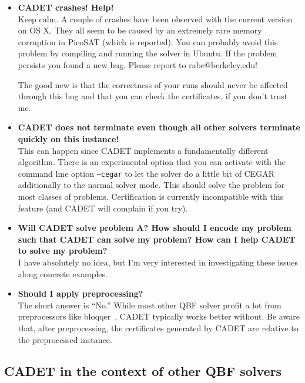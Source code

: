 \documentclass{article}
\begin{document}
\begin{itemize}
	\item {\bf CADET crashes! Help!}  \\[8pt]
		Keep calm. A couple of crashes have been observed with the current version on OS X. They all seem to be  caused by an extremely rare memory corruption in PicoSAT (which is reported). 
		You can probably avoid this problem by compiling and running the solver in Ubuntu. 
		If the problem persists you found a new bug. Please report to rabe@berkeley.edu!
		
		The good new is that the correctness of your runs should never be affected through this bug and that you can check the certificates, if you don't trust me. 
	\item {\bf CADET does not terminate even though all other solvers terminate quickly on this instance!} \\[8pt]
		This can happen since CADET implements a fundamentally different algorithm. 
		There is an experimental option that you can activate with the command line option \texttt{--cegar} to let the solver do a little bit of CEGAR additionally to the normal solver mode. 
		This should solve the problem for most classes of problems. 
		Certification is currently incompatible with this feature (and CADET will complain if you try).
		
	\item {\bf Will CADET solve problem A? How should I encode my problem such that CADET can solve my problem? How can I help CADET to solve my problem?}\\[10pt]
		I have absolutely no idea, but I'm very interested in investigating these issues along concrete examples. 
	\item {\bf Should I apply preprocessing?} \\[10pt]
		The short answer is ``No.'' While most other QBF solver profit a lot from preprocessors like bloqqer~\cite{BiereLS/2011/QBCE_Bloqqer}, CADET typically works better without. 
		Be aware that, after preprocessing, the certificates generated by CADET are relative to the preprocessed instance. 
\end{itemize}

\subsection{CADET in the context of other QBF solvers}
\end{document}
